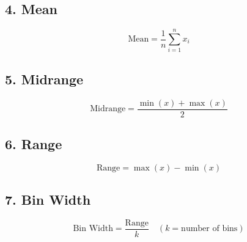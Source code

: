\documentclass[a4paper,10pt]{article}
\begin{document}
\subsection*{4. Mean}

\[
\text{Mean} = \frac{1}{n}\sum_{i=1}^{n} x_i
\]

\vspace{0.5cm}

\subsection*{5. Midrange}

\[
\text{Midrange} = \frac{\min(x) + \max(x)}{2}
\]

\vspace{0.5cm}

\subsection*{6. Range}

\[
\text{Range} = \max(x) - \min(x)
\]

\vspace{0.5cm}

\subsection*{7. Bin Width}

\[
\text{Bin Width} = \frac{\text{Range}}{k} \quad (k = \text{number of bins})
\]
\end{document}
